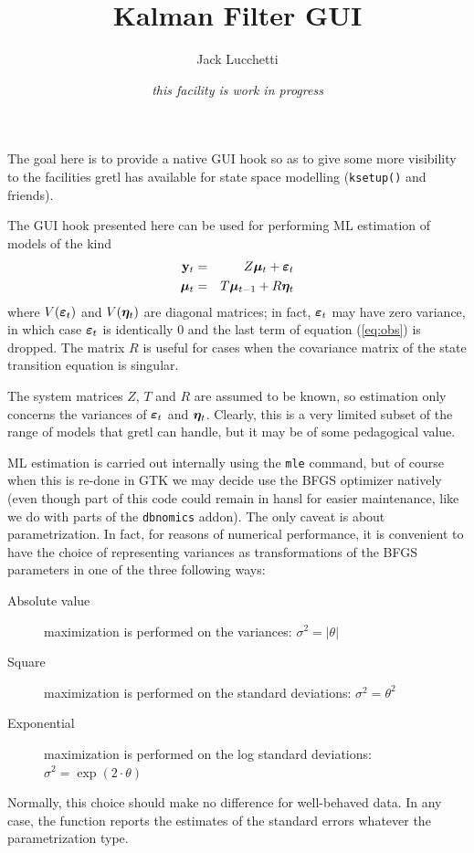 \documentclass[a4paper]{article}
\title{Kalman Filter GUI}
\author{Jack Lucchetti}
\date{\it this facility is work in progress}
\newcommand{\obs}{\ensuremath\mathbf{y}_t}
\newcommand{\obsdist}{\ensuremath\boldsymbol{\varepsilon}_t}
\newcommand{\state}[1]{\ensuremath\boldsymbol{\mu}_{#1}}
\newcommand{\stdist}{\ensuremath\boldsymbol{\eta}_t}
\begin{document}
\maketitle

The goal here is to provide a native GUI hook so as to give some more
visibility to the facilities gretl has available for state space
modelling (\texttt{ksetup()} and friends).

The GUI hook presented here can be used for performing ML estimation of
models of the kind
\begin{eqnarray}
  \label{eq:obs}
  \obs & = & Z \state{t} + \obsdist \\
  \label{eq:state}
  \state{t} & = & T \state{t-1} + R \stdist
\end{eqnarray}
where $V(\obsdist)$ and $V(\stdist)$ are diagonal matrices; in fact,
$\obsdist$ may have zero variance, in which case $\obsdist$ is
identically 0 and the last term of equation (\ref{eq:obs}) is
dropped. The matrix $R$ is useful for cases when the covariance matrix
of the state transition equation is singular.

The system matrices $Z$, $T$ and $R$ are assumed to be known,
so estimation only concerns the variances of $\obsdist$ and $\stdist$.
Clearly, this is a very limited subset of the range of models that
gretl can handle, but it may be of some pedagogical value.

ML estimation is carried out internally using the \texttt{mle}
command, but of course when this is re-done in GTK we may decide use
the BFGS optimizer natively (even though part of this code could
remain in hansl for easier maintenance, like we do with parts of the
\texttt{dbnomics} addon). The only caveat is about parametrization. In
fact, for reasons of numerical performance, it is convenient to have
the choice of representing variances as transformations of the BFGS
parameters in one of the three following ways:

\begin{description}
\item[Absolute value] maximization is performed on the variances:
  $\sigma^2 = |\theta|$
\item[Square] maximization is performed on the standard deviations:
  $\sigma^2 = \theta^2$
\item[Exponential] maximization is performed on the log standard deviations:
  $\sigma^2 = \exp(2 \cdot \theta)$
\end{description}

Normally, this choice should make no difference for well-behaved
data. In any case, the function reports the estimates of the standard
errors whatever the parametrization type.
\end{document}
